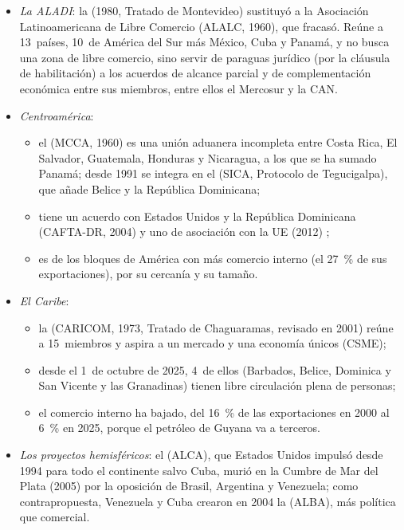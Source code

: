 \documentclass[11pt]{article}
\begin{document}
\begin{itemize}
\item \emph{La ALADI}: la  (1980, Tratado de Montevideo) sustituyó a la Asociación Latinoamericana de Libre Comercio (ALALC, 1960), que fracasó. Reúne a 13~países, 10~de América del Sur más México, Cuba y Panamá, y no busca una zona de libre comercio, sino servir de paraguas jurídico (por la cláusula de habilitación) a los acuerdos de alcance parcial y de complementación económica entre sus miembros, entre ellos el Mercosur y la CAN.
\item \emph{Centroamérica}:
  \begin{itemize}
  \item el  (MCCA, 1960) es una unión aduanera incompleta entre Costa Rica, El Salvador, Guatemala, Honduras y Nicaragua, a los que se ha sumado Panamá; desde 1991 se integra en el  (SICA, Protocolo de Tegucigalpa), que añade Belice y la República Dominicana;
  \item tiene un acuerdo con Estados Unidos y la República Dominicana (CAFTA-DR, 2004) y uno de asociación con la UE (2012) ;
  \item es de los bloques de América con más comercio interno (el 27~\% de sus exportaciones), por su cercanía y su tamaño.
  \end{itemize}
\item \emph{El Caribe}:
  \begin{itemize}
  \item la  (CARICOM, 1973, Tratado de Chaguaramas, revisado en 2001) reúne a 15~miembros y aspira a un mercado y una economía únicos (CSME);
  \item desde el 1~de octubre de 2025, 4~de ellos (Barbados, Belice, Dominica y San Vicente y las Granadinas) tienen libre circulación plena de personas\nocite{CARICOM2025Circulacion};
  \item el comercio interno ha bajado, del 16~\% de las exportaciones en 2000 al 6~\% en 2025, porque el petróleo de Guyana va a terceros.
  \end{itemize}
\item \emph{Los proyectos hemisféricos}: el  (ALCA), que Estados Unidos impulsó desde 1994 para todo el continente salvo Cuba, murió en la Cumbre de Mar del Plata (2005) por la oposición de Brasil, Argentina y Venezuela; como contrapropuesta, Venezuela y Cuba crearon en 2004 la  (ALBA), más política que comercial.
\end{itemize}
\end{document}
